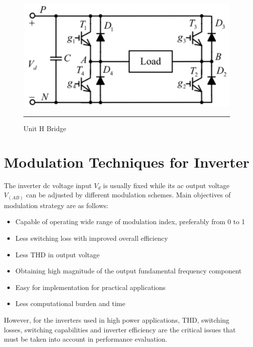 \begin{figure}[htbp]
	\centering
		\includegraphics[width = 5in]{./Figures/h-bridge.pdf}
		\rule{35em}{3pt}
	\caption{Unit H Bridge}
	\label{fig:5}
\end{figure}
\section{Modulation Techniques for Inverter}
 The inverter dc voltage input $V_d$ is usually fixed while its ac output voltage $V_(AB)$ can be adjusted by different modulation schemes.
Main objectives of modulation strategy are as follows:
\begin{itemize}
\item Capable of operating wide range of modulation index, preferably
from 0 to 1
\item Less switching loss with improved overall efficiency
\item Less THD in output voltage
\item Obtaining high magnitude of the output fundamental frequency
component
\item Easy for implementation for practical applications
\item Less computational burden and time
\end{itemize}
However, for the inverters used in high power applications,
THD, switching losses, switching capabilities and inverter
efficiency are the critical issues that must be taken into account in
performance evaluation.
